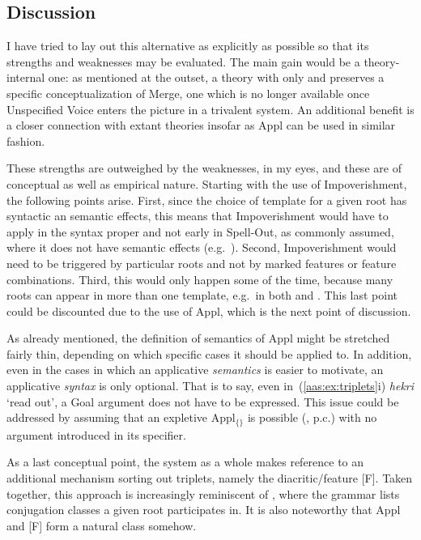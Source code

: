 	
	\subsection{Discussion} \label{aas:jim:cons}
I have tried to lay out this alternative as explicitly as possible so that its strengths and weaknesses may be evaluated. The main gain would be a theory-internal one: as mentioned at the outset, a theory with only {\vds} and {\vzs} preserves a specific conceptualization of Merge, one which is no longer available once Unspecified Voice enters the picture in a trivalent system. An additional benefit is a closer connection with extant theories insofar as Appl can be used in similar fashion.

These strengths are outweighed by the weaknesses, in my eyes, and these are of conceptual as well as empirical nature. Starting with the use of Impoverishment, the following points arise. First, since the choice of template for a given root has syntactic an semantic effects, this means that Impoverishment would have to apply in the syntax proper and not early in Spell-Out, as commonly assumed, where it does not have semantic effects (e.g.~\citealt{harbour03}). Second, Impoverishment would need to be triggered by particular roots and not by marked features or feature combinations. Third, this would only happen some of the time, because many roots can appear in more than one template, e.g.~in both {\thif} and {\tkal}. This last point could be discounted due to the use of Appl, which is the next point of discussion.

As already mentioned, the definition of semantics of Appl might be stretched fairly thin, depending on which specific cases it should be applied to. In addition, even in the cases in which an applicative \emph{semantics} is easier to motivate, an applicative \emph{syntax} is only optional. That is to say, even in~(\ref{aas:ex:triplets}i) \emph{hekri} `read out', a Goal argument does not have to be expressed. This issue could be addressed by assuming that an expletive Appl$_{\text{\{\}}}$ is possible (\citealt{wood15springer}, p.c.) with no argument introduced in its specifier.

As a last conceptual point, the system as a whole makes reference to an additional mechanism sorting out triplets, namely the diacritic/feature [F]. Taken together, this approach is increasingly reminiscent of \cite{arad05}, where the grammar lists conjugation classes a given root participates in. It is also noteworthy that Appl and [F] form a natural class somehow. 

